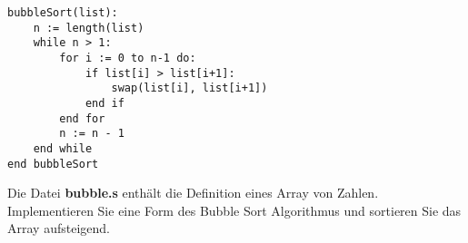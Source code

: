 \documentclass[12pt]{article}
\begin{document}
\begin{lstlisting}
bubbleSort(list):
	n := length(list)
	while n > 1:
		for i := 0 to n-1 do:
			if list[i] > list[i+1]:
				swap(list[i], list[i+1])
			end if
		end for
		n := n - 1
	end while
end bubbleSort
\end{lstlisting}

Die Datei \textbf{bubble.s} enthält die Definition eines Array von Zahlen.
Implementieren Sie eine Form des Bubble Sort Algorithmus und sortieren Sie
das Array aufsteigend.
\end{document}
